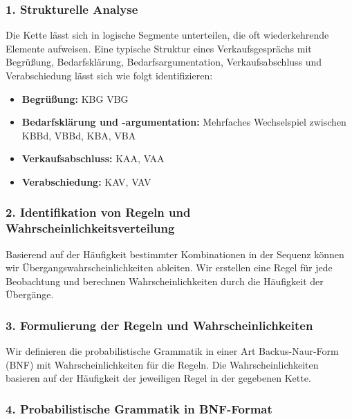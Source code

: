 \documentclass[
]{article}
\begin{document}
\subsubsection{1. Strukturelle Analyse}\label{strukturelle-analyse}

Die Kette lässt sich in logische Segmente unterteilen, die oft wiederkehrende Elemente aufweisen. Eine typische Struktur eines Verkaufsgesprächs mit Begrüßung, Bedarfsklärung, Bedarfsargumentation, Verkaufsabschluss und Verabschiedung lässt sich wie folgt identifizieren:

\begin{itemize}
\item \textbf{Begrüßung:} KBG VBG
\item \textbf{Bedarfsklärung und -argumentation:} Mehrfaches Wechselspiel zwischen KBBd, VBBd, KBA, VBA
\item \textbf{Verkaufsabschluss:} KAA, VAA
\item \textbf{Verabschiedung:} KAV, VAV
\end{itemize}

\subsubsection{2. Identifikation von Regeln und Wahrscheinlichkeitsverteilung}\label{identifikation-von-regeln-und-wahrscheinlichkeitsverteilung}

Basierend auf der Häufigkeit bestimmter Kombinationen in der Sequenz können wir Übergangswahrscheinlichkeiten ableiten. Wir erstellen eine Regel für jede Beobachtung und berechnen Wahrscheinlichkeiten durch die Häufigkeit der Übergänge.

\subsubsection{3. Formulierung der Regeln und Wahrscheinlichkeiten}\label{formulierung-der-regeln-und-wahrscheinlichkeiten}

Wir definieren die probabilistische Grammatik in einer Art Backus-Naur-Form (BNF) mit Wahrscheinlichkeiten für die Regeln. Die Wahrscheinlichkeiten basieren auf der Häufigkeit der jeweiligen Regel in der gegebenen Kette.

\subsubsection{4. Probabilistische Grammatik in BNF-Format}\label{probabilistische-grammatik-in-bnf-format}
\end{document}
